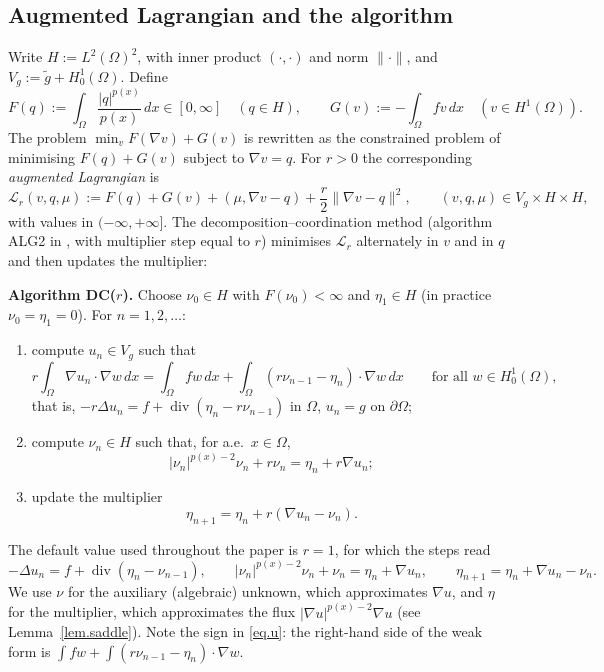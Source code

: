 \documentclass[11pt]{amsart}
\newcommand{\LL}{\mathcal L}
\newcommand{\dx}{\,dx}
\DeclareMathOperator{\dvg}{div}
\theoremstyle{definition}
\theoremstyle{remark}
\numberwithin{equation}{section}
\begin{document}
\subsection{Augmented Lagrangian and the algorithm}
Write $H:=L^2(\Omega)^2$, with inner product $(\cdot,\cdot)$ and norm $\|\cdot\|$, and $V_g:=\tilde g+H^1_0(\Omega)$. Define
$$
F(q):=\int_\Omega\frac{|q|^{p(x)}}{p(x)}\dx\in[0,\infty]\quad(q\in H),\qquad G(v):=-\int_\Omega fv\dx\quad(v\in H^1(\Omega)).
$$
The problem $\min_v F(\nabla v)+G(v)$ is rewritten as the constrained problem of minimising $F(q)+G(v)$ subject to $\nabla v=q$. For $r>0$ the corresponding \emph{augmented Lagrangian} is
\begin{equation}\label{eq.Lr}
\LL_r(v,q,\mu) := F(q)+G(v)+(\mu,\nabla v-q)+\frac r2\|\nabla v-q\|^2,\qquad (v,q,\mu)\in V_g\times H\times H,
\end{equation}
with values in $(-\infty,+\infty]$. The decomposition--coordination method (algorithm ALG2 in \cite{FG, Glowinski}, with multiplier step equal to $r$) minimises $\LL_r$ alternately in $v$ and in $q$ and then updates the multiplier:

\medskip
\noindent\textbf{Algorithm DC($r$).} Choose $\nu_0\in H$ with $F(\nu_0)<\infty$ and $\eta_1\in H$ (in practice $\nu_0=\eta_1=0$). For $n=1,2,\dots$:
\begin{enumerate}
\item[(i)] compute $u_n\in V_g$ such that
\begin{equation}\label{eq.u}
r\int_\Omega\nabla u_n\cdot\nabla w\dx=\int_\Omega fw\dx+\int_\Omega(r\nu_{n-1}-\eta_n)\cdot\nabla w\dx\qquad\text{for all }w\in H^1_0(\Omega),
\end{equation}
that is, $-r\Delta u_n=f+\dvg(\eta_n-r\nu_{n-1})$ in $\Omega$, $u_n=g$ on $\partial\Omega$;
\item[(ii)] compute $\nu_n\in H$ such that, for a.e.\ $x\in\Omega$,
\begin{equation}\label{eq.nu}
|\nu_n|^{p(x)-2}\nu_n+r\nu_n=\eta_n+r\nabla u_n;
\end{equation}
\item[(iii)] update the multiplier
\begin{equation}\label{eq.eta}
\eta_{n+1}=\eta_n+r(\nabla u_n-\nu_n).
\end{equation}
\end{enumerate}

The default value used throughout the paper is $r=1$, for which the steps read
$$
-\Delta u_n=f+\dvg(\eta_n-\nu_{n-1}),\qquad |\nu_n|^{p(x)-2}\nu_n+\nu_n=\eta_n+\nabla u_n,\qquad \eta_{n+1}=\eta_n+\nabla u_n-\nu_n.
$$
We use $\nu$ for the auxiliary (algebraic) unknown, which approximates $\nabla u$, and $\eta$ for the multiplier, which approximates the flux $|\nabla u|^{p(x)-2}\nabla u$ (see Lemma~\ref{lem.saddle}). Note the sign in \eqref{eq.u}: the right-hand side of the weak form is $\int f w+\int(r\nu_{n-1}-\eta_n)\cdot\nabla w$.
\end{document}
